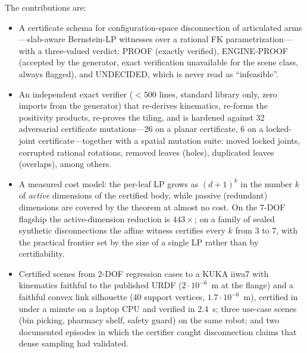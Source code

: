 \documentclass[10pt,twocolumn,letterpaper]{article}
\begin{document}
The contributions are:
\begin{itemize}
\item[\textbf{(C1)}] A certificate schema for configuration-space disconnection of articulated arms---slab-aware Bernstein-LP witnesses over a rational FK parametrization---with a three-valued verdict: PROOF (exactly verified), ENGINE-PROOF (accepted by the generator, exact verification unavailable for the scene class, always flagged), and UNDECIDED, which is never read as ``infeasible''.
\item[\textbf{(C2)}] An independent exact verifier ($<500$ lines, standard library only, zero imports from the generator) that re-derives kinematics, re-forms the positivity products, re-proves the tiling, and is hardened against 32 adversarial certificate mutations---26 on a planar certificate, 6 on a locked-joint certificate---together with a spatial mutation suite: moved locked joints, corrupted rational rotations, removed leaves (holes), duplicated leaves (overlaps), among others.
\item[\textbf{(C3)}] A measured cost model: the per-leaf LP grows as $(d+1)^k$ in the number $k$ of \emph{active} dimensions of the certified body, while passive (redundant) dimensions are covered by the theorem at almost no cost. On the 7-DOF flagship the active-dimension reduction is $443\times$; on a family of sealed synthetic disconnections the affine witness certifies every $k$ from 3 to 7, with the practical frontier set by the size of a single LP rather than by certifiability.
\item[\textbf{(C4)}] Certified scenes from 2-DOF regression cases to a KUKA iiwa7 with kinematics faithful to the published URDF ($2\cdot10^{-6}$~m at the flange) and a faithful convex link silhouette (40 support vertices, $1.7\cdot10^{-6}$~m), certified in under a minute on a laptop CPU and verified in 2.4~s; three use-case scenes (bin picking, pharmacy shelf, safety guard) on the same robot; and two documented episodes in which the certifier caught disconnection claims that dense sampling had validated.
\end{itemize}
\end{document}
